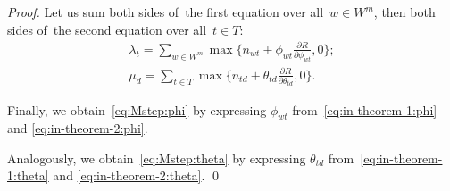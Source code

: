 \documentclass{llncs}
\begin{document}
\begin{proof}
    Let us sum
    both sides of~the first equation over all~${w\in W^m}$,
    then
    both sides of~the second equation over all~${t\in T}$:
    \begin{gather}
    \label{eq:in-theorem-2:phi}
        \lambda_t
        =
        \sum_{w\in W^m}
        \max\biggl\{
        n_{wt} + \phi_{wt} \frac{\partial R}{\partial \phi_{wt}}, 0
        \biggr\};
    \\
    \label{eq:in-theorem-2:theta}
        \mu_d
        =
        \sum_{t\in T}
        \max\biggl\{
        n_{td} + \theta_{td} \frac{\partial R}{\partial \theta_{td}}, 0
        \biggr\}.
    \end{gather}

    Finally,
    we obtain~\eqref{eq:Mstep:phi} by expressing $\phi_{wt}$ from~\eqref{eq:in-theorem-1:phi} and \eqref{eq:in-theorem-2:phi}.

    Analogously,
    we obtain~\eqref{eq:Mstep:theta} by expressing $\theta_{td}$ from~\eqref{eq:in-theorem-1:theta} and \eqref{eq:in-theorem-2:theta}.
    \qed
\end{proof}
\end{document}
